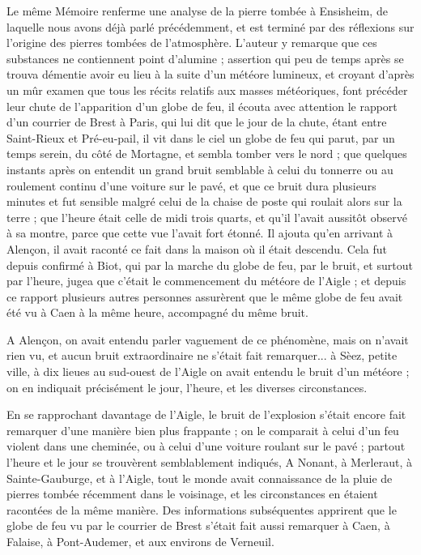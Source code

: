 \documentclass[a4paper, 12pt, oneside, french]{article}
\begin{document}
Le même Mémoire renferme une analyse de la pierre tombée à Ensisheim, de laquelle nous avons déjà parlé précédemment, et est terminé par des réflexions sur l'origine des pierres tombées de l'atmosphère. L'auteur y remarque que ces substances ne contiennent point d'alumine ; assertion qui peu de temps après se trouva démentie avoir eu lieu à la suite d'un météore lumineux, et croyant d'après un mûr examen que tous les récits relatifs aux masses météoriques, font précéder leur chute de l'apparition d'un globe de feu, il écouta avec attention le rapport d'un courrier de Brest à Paris, qui lui dit que le jour de la chute, étant entre Saint-Rieux et Pré-eu-pail, il vit dans le ciel un globe de feu qui parut, par un temps serein, du côté de Mortagne, et sembla tomber vers le nord ; que quelques instants après on entendit un grand bruit semblable à celui du tonnerre ou au roulement continu d'une voiture sur le pavé, et que ce bruit dura plusieurs minutes et fut sensible malgré celui de la chaise de poste qui roulait alors sur la terre ; que l'heure était celle de midi trois quarts, et qu'il l'avait aussitôt observé à sa montre, parce que cette vue l'avait fort étonné. Il ajouta qu'en arrivant à Alençon, il avait raconté ce fait dans la maison où il était descendu. Cela fut depuis confirmé à Biot, qui par la marche du globe de feu, par le bruit, et surtout par l'heure, jugea que c'était le commencement du météore de l'Aigle ; et depuis ce rapport plusieurs autres personnes assurèrent que le même globe de feu avait été vu à Caen à la même heure, accompagné du même bruit.

A Alençon, on avait entendu parler vaguement de ce phénomène, mais on n'avait rien vu, et aucun bruit extraordinaire ne s'était fait remarquer... à Sèez, petite ville, à dix lieues au sud-ouest de l'Aigle on avait entendu le bruit d'un météore ; on en indiquait précisément le jour, l'heure, et les diverses circonstances.

En se rapprochant davantage de l'Aigle, le bruit de l'explosion s'était encore fait remarquer d'une manière bien plus frappante ; on le comparait à celui d'un feu violent dans une cheminée, ou à celui d'une voiture roulant sur le pavé ; partout l'heure et le jour se trouvèrent semblablement indiqués, A Nonant, à Merleraut, à Sainte-Gauburge, et à l'Aigle, tout le monde avait connaissance de la pluie de pierres tombée récemment dans le voisinage, et les circonstances en étaient racontées de la même manière. Des informations subséquentes apprirent que le globe de feu vu par le courrier de Brest s'était fait aussi remarquer à Caen, à Falaise, à Pont-Audemer, et aux environs de Verneuil.
\end{document}
